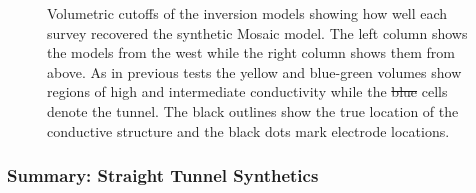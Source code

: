 \documentclass[preprint,authoryear,12pt]{elsarticle}
\providecommand{\DIFaddtex}[1]{{\protect\color{blue}\uwave{#1}}} %
\providecommand{\DIFdeltex}[1]{{\protect\color{red}\sout{#1}}}                      %
\providecommand{\DIFaddFL}[1]{\DIFadd{#1}} %
\providecommand{\DIFdelFL}[1]{\DIFdel{#1}} %
\providecommand{\DIFaddbeginFL}{} %
\providecommand{\DIFaddendFL}{} %
\providecommand{\DIFdelbeginFL}{} %
\providecommand{\DIFdelendFL}{} %
\providecommand{\DIFadd}[1]{\texorpdfstring{\DIFaddtex{#1}}{#1}} %
\providecommand{\DIFdel}[1]{\texorpdfstring{\DIFdeltex{#1}}{}} %
\begin{document}
\begin{figure}[htp]{}
\begin{center}
   \DIFdelendFL \end{center}
\vspace{-0.4cm}
\caption{Volumetric cutoffs of the inversion models showing how well each survey recovered the synthetic Mosaic model. The left column shows the models from the west while the right column shows them from above. As in previous tests the yellow and blue-green volumes show regions of high and intermediate conductivity while the \DIFdelbeginFL \DIFdelFL{blue }\DIFdelendFL \DIFaddbeginFL \DIFaddFL{dark purple }\DIFaddendFL cells denote the tunnel. The black outlines show the true location of the conductive structure and the black dots mark electrode locations.}
\label{fig:StraightTunnel_SynthMosaic2_Isosurfaces}
\end{figure}



\subsubsection{Summary: Straight Tunnel Synthetics}
\label{sec:RingArray_Development_Straight_Synth_Summary}
\end{document}
